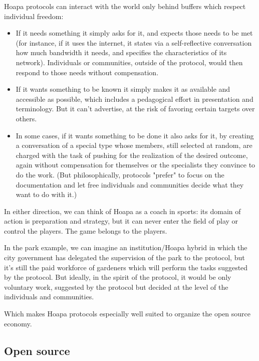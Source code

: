 \documentclass[11pt]{article}
\begin{document}
Hoapa protocols can interact with the world only behind buffers which respect individual freedom:

\begin{itemize}

\item If it needs something it simply asks for it, and expects those needs to be met (for instance, if it uses the internet, it states via a self-reflective conversation how much bandwidth it needs, and specifies the characteristics of its network). Individuals or communities, outside of the protocol, would then respond to those needs without compensation.

\item If it wants something to be known it simply makes it as available and accessible as possible, which includes a pedagogical effort in presentation and terminology. But it can't advertise, at the risk of favoring certain targets over others.

\item In some cases, if it wants something to be done it also asks for it, by creating a conversation of a special type whose members, still selected at random, are charged with the task of pushing for the realization of the desired outcome, again without compensation for themselves or the specialists they convince to do the work. (But philosophically, protocols "prefer" to focus on the documentation and let free individuals and communities decide what they want to do with it.)

\end{itemize}

In either direction, we can think of Hoapa as a coach in sports: its domain of action is preparation and strategy, but it can never enter the field of play or control the players. The game belongs to the players.

In the park example, we can imagine an institution/Hoapa hybrid in which the city government has delegated the supervision of the park to the protocol, but it's still the paid workforce of gardeners which will perform the tasks suggested by the protocol. But ideally, in the spirit of the protocol, it would be only voluntary work, suggested by the protocol but decided at the level of the individuals and communities.

Which makes Hoapa protocols especially well suited to organize the open source economy.

\subsection{Open source}
\end{document}
